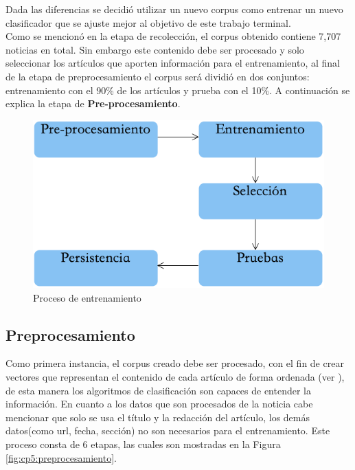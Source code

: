 Dada las diferencias se decidió utilizar un nuevo corpus como entrenar un nuevo clasificador que se ajuste mejor al objetivo de este trabajo terminal.\\


Como se mencionó en la etapa de recolección, el corpus obtenido contiene 7,707 noticias en total. Sin embargo este contenido debe ser procesado y solo seleccionar los artículos que aporten información para el entrenamiento, al final de la etapa de pre\-procesamiento el corpus será dividió en dos conjuntos: entrenamiento con el 90\% de los artículos y prueba con el 10\%. A continuación se explica la etapa de \textbf{Pre-procesamiento}.\\

\begin{figure}[h]
\centering
\includegraphics[scale=.55]{imagenes/capitulo5/Entrenamiento/Esquema.png}
\caption{Proceso de entrenamiento}
\label{fig:cp5:procesoE}
\end{figure}



\subsection{Preprocesamiento}

Como primera instancia, el corpus creado debe ser procesado, con el fin de crear vectores que representan el contenido de cada artículo de forma ordenada (ver ), de esta manera los algoritmos de clasificación son capaces de entender la información. En cuanto a los datos que son procesados de la noticia cabe mencionar que solo se usa el título y la redacción del artículo, los demás datos(como url, fecha, sección) no son necesarios para el entrenamiento. Este proceso consta de 6 etapas, las cuales son mostradas en la Figura \ref{fig:cp5:preprocesamiento}. \\

